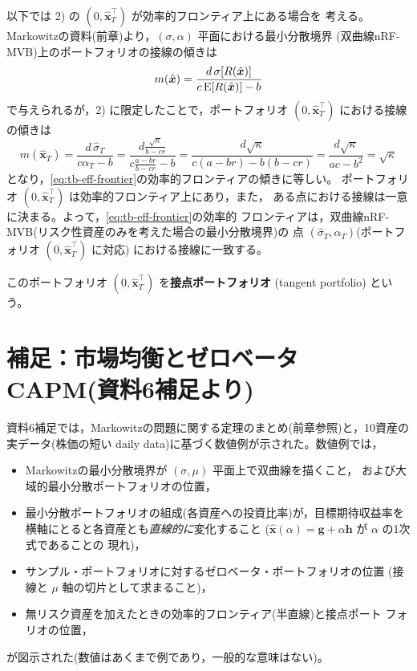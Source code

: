 以下では 2) の $(0,\hat{\bm{x}}_T^\top)$ が効率的フロンティア上にある場合を
考える。Markowitzの資料(前章)より，$(\sigma,\alpha)$ 平面における最小分散境界
(双曲線nRF-MVB)上のポートフォリオの接線の傾きは
\begin{equation}
m(\hat{\bm{x}}) = \frac{d\,\sigma[R(\hat{\bm{x}})]}{c\,\mathrm{E}[R(\hat{\bm{x}})] - b}
\end{equation}
で与えられるが，2) に限定したことで，ポートフォリオ $(0,\hat{\bm{x}}_T^\top)$
における接線の傾きは
\begin{equation}
m(\hat{\bm{x}}_T) = \frac{d\,\hat\sigma_T}{c\alpha_T - b}
= \frac{d\frac{\sqrt{\kappa}}{b-cr}}{c\frac{a-br}{b-cr} - b}
= \frac{d\sqrt{\kappa}}{c(a-br) - b(b-cr)}
= \frac{d\sqrt{\kappa}}{ac - b^2} = \sqrt{\kappa}
\end{equation}
となり，\eqref{eq:tb-eff-frontier}の効率的フロンティアの傾きに等しい。
ポートフォリオ $(0,\hat{\bm{x}}_T^\top)$ は効率的フロンティア上にあり，また，
ある点における接線は一意に決まる。よって，\eqref{eq:tb-eff-frontier}の効率的
フロンティアは，双曲線nRF-MVB(リスク性資産のみを考えた場合の最小分散境界)の
点 $(\hat\sigma_T,\alpha_T)$(ポートフォリオ $(0,\hat{\bm{x}}_T^\top)$ に対応)
における接線に一致する。

\begin{keypoint}
このポートフォリオ $(0,\hat{\bm{x}}_T^\top)$ を\textbf{接点ポートフォリオ}
(tangent portfolio) という。
\end{keypoint}

\section{補足：市場均衡とゼロベータCAPM(資料6補足より)}

資料6補足では，Markowitzの問題に関する定理のまとめ(前章参照)と，10資産の
実データ(株価の短い daily data)に基づく数値例が示された。数値例では，
\begin{itemize}
\item Markowitzの最小分散境界が $(\sigma,\mu)$ 平面上で双曲線を描くこと，
および大域的最小分散ポートフォリオの位置，
\item 最小分散ポートフォリオの組成(各資産への投資比率)が，目標期待収益率を
横軸にとると各資産とも\emph{直線的に}変化すること
($\hat{\bm{x}}(\alpha) = \bm{g}+\alpha\bm{h}$ が $\alpha$ の1次式であることの
現れ)，
\item サンプル・ポートフォリオに対するゼロベータ・ポートフォリオの位置
(接線と $\mu$ 軸の切片として求まること)，
\item 無リスク資産を加えたときの効率的フロンティア(半直線)と接点ポート
フォリオの位置，
\end{itemize}
が図示された(数値はあくまで例であり，一般的な意味はない)。

